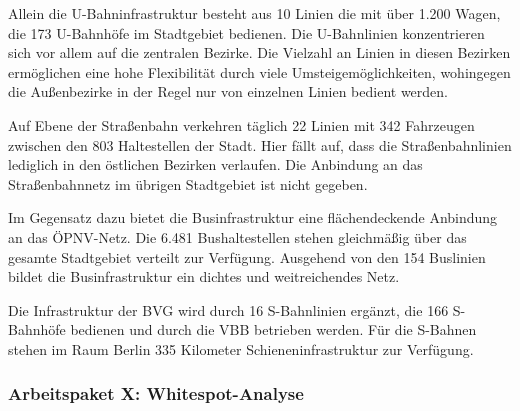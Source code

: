 Allein die U-Bahninfrastruktur besteht aus 10 Linien die mit über 1.200 Wagen, die 173 U-Bahnhöfe im Stadtgebiet bedienen. Die U-Bahnlinien konzentrieren sich vor allem auf die zentralen Bezirke. Die Vielzahl an Linien in diesen Bezirken ermöglichen eine hohe Flexibilität durch viele Umsteigemöglichkeiten, wohingegen die Außenbezirke in der Regel nur von einzelnen Linien bedient werden.

Auf Ebene der Straßenbahn verkehren täglich 22 Linien mit 342 Fahrzeugen zwischen den 803 Haltestellen der Stadt. Hier fällt auf, dass die Straßenbahnlinien lediglich in den östlichen Bezirken verlaufen. Die Anbindung an das Straßenbahnnetz im übrigen Stadtgebiet ist nicht gegeben.

Im Gegensatz dazu bietet die Businfrastruktur eine flächendeckende Anbindung an das ÖPNV-Netz. Die 6.481 Bushaltestellen stehen gleichmäßig über das gesamte Stadtgebiet verteilt zur Verfügung. Ausgehend von den 154 Buslinien bildet die Businfrastruktur ein dichtes und weitreichendes Netz.

Die Infrastruktur der BVG wird durch 16 S-Bahnlinien ergänzt, die 166 S-Bahnhöfe bedienen und durch die VBB betrieben werden. Für die S-Bahnen stehen im Raum Berlin 335 Kilometer Schieneninfrastruktur zur Verfügung.


\subsubsection{Arbeitspaket X: Whitespot-Analyse}
